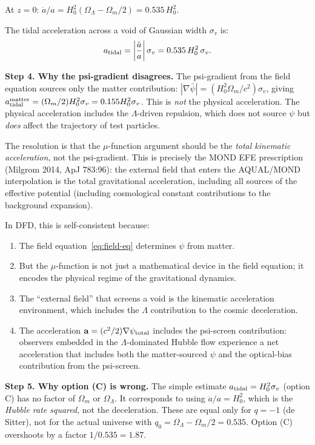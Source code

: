 \documentclass[11pt,a4paper]{article}
\newcounter{findingctr}
\newenvironment{finding}[1][]{%
  \refstepcounter{findingctr}%
  \begin{tcolorbox}[colback=blue!3!white, colframe=blue!50!black,
    title=\textbf{Finding \thefindingctr: #1}]
}{%
  \end{tcolorbox}%
}
\newcommand{\Hzero}{H_0}
\newcommand{\mufd}{\mu}
\newcommand{\Omm}{\Omega_m}
\newcommand{\OmL}{\Omega_\Lambda}
\begin{document}
\begin{finding}[\textbf{CRITICAL}: Option (B) Is Uniquely Correct]
At $z = 0$: $\ddot{a}/a = \Hzero^2(\OmL - \Omm/2) = 0.535\,\Hzero^2$.

The tidal acceleration across a void of Gaussian width $\sigma_v$ is:
\begin{equation}
a_{\rm tidal} = \left|\frac{\ddot{a}}{a}\right|\sigma_v
= 0.535\,\Hzero^2\,\sigma_v.
\label{eq:a-tidal-eff}
\end{equation}

\textbf{Step 4.  Why the psi-gradient disagrees.}  The psi-gradient
from the field equation sources only the matter contribution:
$|\nabla\bar{\psi}| = (\Hzero^2\Omm/c^2)\sigma_v$, giving
$a_{\rm tidal}^{\rm matter} = (\Omm/2)\Hzero^2\sigma_v = 0.155\Hzero^2\sigma_v$.
This is \emph{not} the physical acceleration.  The physical acceleration
includes the $\Lambda$-driven repulsion, which does not source $\psi$
but \emph{does} affect the trajectory of test particles.

The resolution is that the $\mufd$-function argument should be the
\emph{total kinematic acceleration}, not the psi-gradient.  This is
precisely the MOND EFE prescription (Milgrom 2014, ApJ 783:96): the
external field that enters the AQUAL/MOND interpolation is the total
gravitational acceleration, including all sources of the effective
potential (including cosmological constant contributions to the
background expansion).

In DFD, this is self-consistent because:
\begin{enumerate}[nosep]
\item The field equation~\eqref{eq:field-eq} determines $\psi$ from
  matter.
\item But the $\mufd$-function is not just a mathematical device in
  the field equation; it encodes the physical regime of the
  gravitational dynamics.
\item The ``external field'' that screens a void is the kinematic
  acceleration environment, which includes the $\Lambda$ contribution
  to the cosmic deceleration.
\item The acceleration $\mathbf{a} = (c^2/2)\nabla\psi_{\rm total}$
  includes the psi-screen contribution: observers embedded in the
  $\Lambda$-dominated Hubble flow experience a net acceleration that
  includes both the matter-sourced $\psi$ and the optical-bias
  contribution from the psi-screen.
\end{enumerate}

\textbf{Step 5.  Why option (C) is wrong.}  The simple estimate
$a_{\rm tidal} = \Hzero^2\sigma_v$ (option C) has no factor of $\Omm$
or $\OmL$.  It corresponds to using $\ddot{a}/a = \Hzero^2$, which
is the \emph{Hubble rate squared}, not the deceleration.  These are
equal only for $q = -1$ (de Sitter), not for the actual universe
with $q_0 = \OmL - \Omm/2 = 0.535$.  Option (C) overshoots by a
factor $1/0.535 = 1.87$.


\end{finding}
\end{document}
